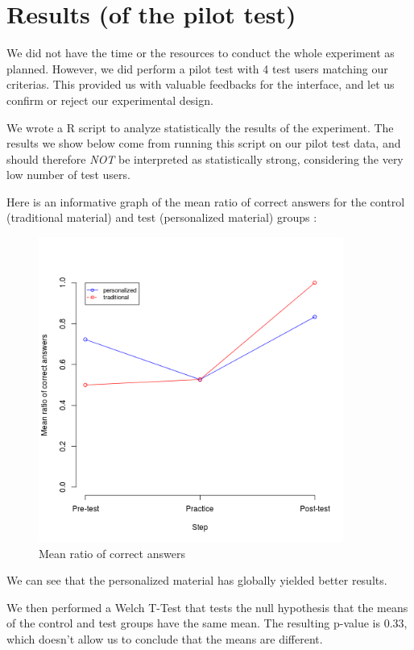 \documentclass[a4paper,12pt]{article}
\begin{document}
\section{Results (of the pilot test)}

We did not have the time or the resources to conduct the whole experiment as planned. However, we did perform a pilot test with 4 test users matching our criterias. This provided us with valuable feedbacks for the interface, and let us confirm or reject our experimental design.

We wrote a R script to analyze statistically the results of the experiment.
The results we show below come from running this script on our pilot test data, and should therefore \textit{NOT} be interpreted as statistically strong, considering the very low number of test users.

Here is an informative graph of the mean ratio of correct answers for the control (traditional material) and test (personalized material) groups :

\begin{figure}[H]
\begin{center}
\includegraphics[width=10cm]{means.png}
\caption{Mean ratio of correct answers}
\label{means}
\end{center}
\end{figure}

We can see that the personalized material has globally yielded better results.

We then performed a Welch T-Test that tests the null hypothesis that the means of the control and test groups have the same mean. The resulting p-value is 0.33, which doesn't allow us to conclude that the means are different.
\end{document}
